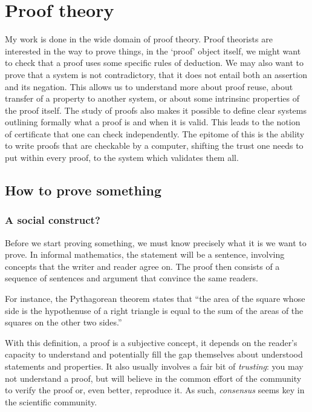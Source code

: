\chapter{Proof theory}

My work is done in the wide domain of proof theory. Proof theorists are
interested in the way to prove things, in the `proof' object itself, \eg we
might want to check that a proof uses some specific rules of deduction.
We may also want to prove that a system is not contradictory, \ie that it does
not entail both an assertion and its negation.
This allows us to understand more about proof reuse, about transfer of a
property to another system, or about some intrinsinc properties of the proof
itself. The study of proofs also makes it possible to define clear systems
outlining formally what a proof is and when it is valid. This leads to the
notion of certificate that one can check independently. The epitome of this is
the ability to write proofs that are checkable by a computer, shifting the trust
one needs to put within every proof, to the system which validates them all.

\section{How to prove something}

\subsection{A social construct?}

Before we start proving something, we must know precisely what it is we want to
prove. In informal mathematics, the statement will be a sentence, involving
concepts that the writer and reader agree on. The proof then consists of a
sequence of sentences and argument that convince the same readers.

For instance, the Pythagorean theorem states that
``the area of the square whose side is the hypothenuse of a right triangle is
equal to the sum of the areas of the squares on the other two sides.''

With this definition, a proof is a subjective concept, it depends on the
reader's capacity to understand and potentially fill the gap themselves about
understood statements and properties. It also usually involves a fair bit of
\emph{trusting}: you may not understand a proof, but will believe in
the common effort of the community to verify the proof or, even better,
reproduce it.
As such, \emph{consensus} seems key in the scientific community.

